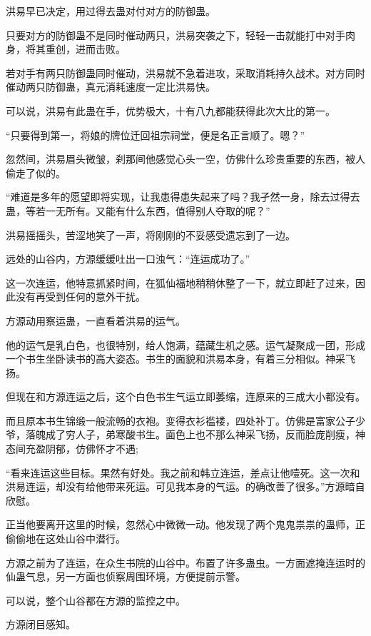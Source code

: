 
\begin{this_body}

洪易早已决定，用过得去蛊对付对方的防御蛊。

只要对方的防御蛊不是同时催动两只，洪易突袭之下，轻轻一击就能打中对手肉身，将其重创，进而击败。

若对手有两只防御蛊同时催动，洪易就不急着进攻，采取消耗持久战术。对方同时催动两只防御蛊，真元消耗速度一定比洪易快。

可以说，洪易有此蛊在手，优势极大，十有八九都能获得此次大比的第一。

“只要得到第一，将娘的牌位迁回祖宗祠堂，便是名正言顺了。嗯？”

忽然间，洪易眉头微皱，刹那间他感觉心头一空，仿佛什么珍贵重要的东西，被人偷走了似的。

“难道是多年的愿望即将实现，让我患得患失起来了吗？我孑然一身，除去过得去蛊，等若一无所有。又能有什么东西，值得别人夺取的呢？”

洪易摇摇头，苦涩地笑了一声，将刚刚的不妥感受遗忘到了一边。

远处的山谷内，方源缓缓吐出一口浊气：“连运成功了。”

这一次连运，他特意抓紧时间，在狐仙福地稍稍休整了一下，就立即赶了过来，因此没有再受到任何的意外干扰。

方源动用察运蛊，一直看着洪易的运气。

他的运气是乳白色，也很特别，给人饱满，蕴藏生机之感。运气凝聚成一团，形成一个书生坐卧读书的高大姿态。书生的面貌和洪易本身，有着三分相似。神采飞扬。

但现在和方源连运之后，这个白色书生气运立即萎缩，连原来的三成大小都没有。

而且原本书生锦缎一般流畅的衣袍。变得衣衫褴褛，四处补丁。仿佛是富家公子少爷，落魄成了穷人子，弟寒酸书生。面色上也不那么神采飞扬，反而脸庞削瘦，神态间充盈阴郁，仿佛怀才不遇;

“看来连运这些目标。果然有好处。我之前和韩立连运，差点让他噎死。这一次和洪易连运，却没有给他带来死运。可见我本身的气运。的确改善了很多。”方源暗自欣慰。

正当他要离开这里的时候，忽然心中微微一动。他发现了两个鬼鬼祟祟的蛊师，正偷偷地在这处山谷中潜行。

方源之前为了连运，在众生书院的山谷中。布置了许多蛊虫。一方面遮掩连运时的仙蛊气息，另一方面也侦察周围环境，方便提前示警。

可以说，整个山谷都在方源的监控之中。

方源闭目感知。


\end{this_body}
